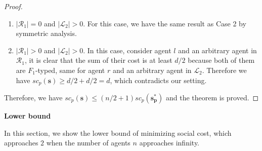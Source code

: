 \documentclass[twoside,11pt]{article}
\newcommand{\bd}{\mathbf}
\begin{document}
\begin{proof}
\begin{enumerate}
\item %
$|\mathcal{R}_1| = 0$ and $|\mathcal{L}_2| > 0$.
%
For this case, we have the same result as Case 2 by symmetric analysis.

\item %
$|\mathcal{R}_1| > 0$ and $|\mathcal{L}_2| > 0$.
%
In this case, consider agent $l$ and an arbitrary agent in $\mathcal{R}_1$, it is clear that the sum of their cost is at least $d/2$ because both of them are $F_1$-typed, same for agent $r$ and an arbitrary agent in $\mathcal{L}_2$.
Therefore we have $sc_p (\bd{s}) \geq d/2 + d/2 = d$, which contradicts our setting.
\end{enumerate}

Therefore, we have $sc_p (\bd{s}) \leq (n/2+1) sc_p (\bd{s_p^*})$ and the theorem is proved.
\end{proof}


\noindent\textbf{Lower bound}

\noindent In this section, we show the lower bound of minimizing social cost, which approaches $2$ when the number of agents $n$ approaches infinity.
\end{document}
